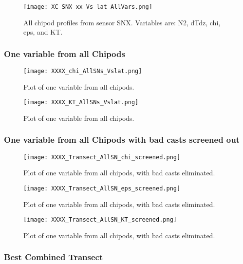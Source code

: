 \documentclass[11pt]{article}
\begin{document}
\begin{figure}[htbp]
\texttt{[image: XC\_SNX\_xx\_Vs\_lat\_AllVars.png]}
\caption{All chipod profiles from sensor SNX. Variables are: N2, dTdz, chi, eps, and KT.}
\label{}
\end{figure}



\clearpage
\newpage
\subsubsection{One variable from all Chipods}

\begin{figure}[htbp]
\texttt{[image: XXXX\_chi\_AllSNs\_Vslat.png]}
\caption{Plot of one variable from all chipods.}
\label{}
\end{figure}

\begin{figure}[htbp]
\texttt{[image: XXXX\_KT\_AllSNs\_Vslat.png]}
\caption{Plot of one variable from all chipods.}
\label{}
\end{figure}



\clearpage
\newpage
\subsubsection{One variable from all Chipods with bad casts screened out}


\begin{figure}[htbp]
\texttt{[image: XXXX\_Transect\_AllSN\_chi\_screened.png]}
\caption{Plot of one variable from all chipods, with bad casts eliminated.}
\label{}
\end{figure}

\begin{figure}[htbp]
\texttt{[image: XXXX\_Transect\_AllSN\_eps\_screened.png]}
\caption{Plot of one variable from all chipods, with bad casts eliminated.}
\label{}
\end{figure}


\begin{figure}[htbp]
\texttt{[image: XXXX\_Transect\_AllSN\_KT\_screened.png]}
\caption{Plot of one variable from all chipods, with bad casts eliminated.}
\label{}
\end{figure}



\clearpage
\newpage
\subsubsection{Best Combined Transect}
\end{document}
